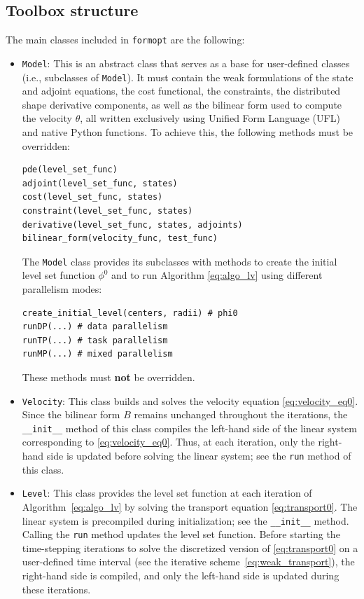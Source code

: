\documentclass[preprint,9pt]{elsarticle}
\begin{document}
\subsection{Toolbox structure}\label{sub:structure}

The main classes included in \texttt{formopt} are the following:
\begin{itemize}
\item \texttt{Model}:
This is an abstract class that serves as a base for user-defined classes
(i.e., subclasses of \texttt{Model}).
It must contain
the weak formulations of the state and adjoint equations,
the cost functional, the constraints,
the distributed shape derivative components, as well as
the bilinear form used to compute the velocity $\theta$,
all written exclusively using Unified Form Language (UFL)
and native Python functions.
To achieve this, the following methods must be overridden:
\begin{lstlisting}
pde(level_set_func)
adjoint(level_set_func, states)
cost(level_set_func, states)
constraint(level_set_func, states)
derivative(level_set_func, states, adjoints)
bilinear_form(velocity_func, test_func)
\end{lstlisting}
The \texttt{Model} class provides its subclasses with
methods to create the initial level set function $\phi^0$
and to run Algorithm \ref{eq:algo_lv} using
different parallelism modes:
\begin{lstlisting}
create_initial_level(centers, radii) # phi0
runDP(...) # data parallelism
runTP(...) # task parallelism
runMP(...) # mixed parallelism
\end{lstlisting}
These methods must \textbf{not} be overridden.

\item \texttt{Velocity}:
This class builds and solves the velocity equation \eqref{eq:velocity_eq0}. 
Since the bilinear form $B$ remains unchanged throughout the iterations,
the \texttt{\_\_init\_\_} method of this class
compiles the left-hand side of the 
linear system corresponding to \eqref{eq:velocity_eq0}.
Thus, at each iteration, only the right-hand side is updated before solving
the linear system; see the \texttt{run} method of this class. 

\item \texttt{Level}:
This class provides the level set function at each iteration
of Algorithm~\ref{eq:algo_lv}
by solving the transport equation \eqref{eq:transport0}. 
The linear system is precompiled during initialization;
see the \texttt{\_\_init\_\_} method. 
Calling the \texttt{run} method updates the level set function.
Before starting the time-stepping iterations
to solve the discretized version of \eqref{eq:transport0}
on a user-defined time interval
(see the iterative scheme~\eqref{eq:weak_transport}),
the right-hand side is compiled,
and only the left-hand side is updated during these iterations.


\end{itemize}
\end{document}

